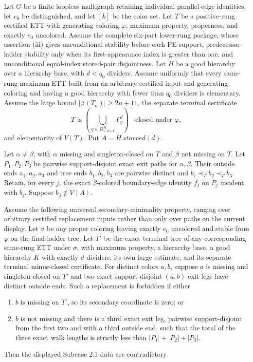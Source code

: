 \begin{lemma}
Let $G$ be a finite loopless multigraph retaining individual parallel-edge
identities, let $e_0$ be distinguished, and let $[k]$ be the color set.
Let $T$ be a positive-rung certified ETT with generating coloring
$\varphi$, maximum property, properness, and exactly $e_0$ uncolored.
Assume the complete six-part lower-rung package, whose assertion (iii) gives
unconditional stability before each PE support, predecessor-ladder stability
only when its first-appearance index is greater than one, and unconditional
equal-index stored-pair disjointness.  Let $H$ be a good
hierarchy over a hierarchy base, with $d<q_0$ dividers.  Assume uniformly
that every same-rung maximum ETT built from an arbitrary certified input
and generating coloring and having a good hierarchy with fewer than
$q_0$ dividers is elementary.  Assume the large bound
$|\overline\varphi(T_n)|\geq2n+11$, the separate terminal certificate
\[
 T\text{ is }
 \left(\bigcup_{\eta\in D^H_{n,d+1}}\Gamma^d_\eta\right)^-
 \text{-closed under }\varphi,
\]
and elementarity of $V(T)$.  Put $A=H.\mathit{starred}(d)$.

Let $\alpha\ne\beta$, with $\alpha$ missing and singleton-closed on $T$
and $\beta$ not missing on $T$.  Let $P_1,P_2,P_3$ be pairwise
support-disjoint exact exit paths for $\alpha,\beta$.  Their outside ends
$a_1,a_2,a_3$ and tree ends $b_1,b_2,b_3$ are pairwise distinct and
$b_1\prec_T b_2\prec_T b_3$.  Retain, for every $j$, the exact
$\beta$-colored boundary-edge identity $f_j$ on $P_j$ incident with
$b_j$.  Suppose $b_3\notin V(A)$.

Assume the following universal secondary-minimality property, ranging
over arbitrary certified replacement inputs rather than only over paths
on the current display.  Let $\sigma$ be any proper coloring leaving
exactly $e_0$ uncolored and stable from $\varphi$ on the final ladder
tree.  Let $T'$ be the exact terminal tree of any corresponding
same-rung ETT under $\sigma$, with maximum property, a hierarchy base,
a good hierarchy $K$ with exactly $d$ dividers, its own large estimate,
and its separate terminal minus-closed certificate.  For distinct colors
$a,b$, suppose $a$ is missing and singleton-closed on $T'$ and two exact
support-disjoint $(a,b)$ exit legs have distinct outside ends.  Such a
replacement is forbidden if either
\begin{enumerate}
\item $b$ is missing on $T'$, so its secondary coordinate is zero; or
\item $b$ is not missing and there is a third exact exit leg, pairwise
support-disjoint from the first two and with a third outside end, such
that the total of the three exact walk lengths is strictly less than
$|P_1|+|P_2|+|P_3|$.
\end{enumerate}
Then the displayed Subcase 2.1 data are contradictory.
\end{lemma}
